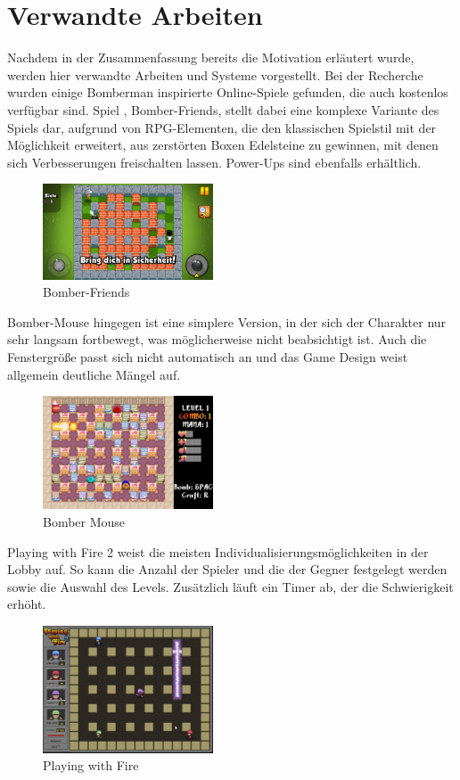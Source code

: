 \documentclass[conference]{IEEEtran}
\begin{document}
\section{Verwandte Arbeiten}
Nachdem in der Zusammenfassung bereits die Motivation erläutert wurde, werden hier verwandte Arbeiten und Systeme vorgestellt. Bei der Recherche wurden einige Bomberman inspirierte Online-Spiele gefunden, die auch kostenlos verfügbar sind. Spiel \cite{bombe-friends}, Bomber-Friends, stellt dabei eine komplexe Variante des Spiels dar, aufgrund von RPG-Elementen, die den klassischen Spielstil mit der Möglichkeit erweitert, aus zerstörten Boxen Edelsteine zu gewinnen, mit denen sich Verbesserungen freischalten lassen. Power-Ups sind ebenfalls erhältlich. 
\begin{figure}[H]
    \centering
    \includegraphics[width=0.45\textwidth]{res/bomberfriends.png}
    \caption{Bomber-Friends}
\end{figure}

Bomber-Mouse \cite{bombermouse} hingegen ist eine simplere Version, in der sich der Charakter nur sehr langsam fortbewegt, was möglicherweise nicht beabsichtigt ist. Auch die Fenstergröße passt sich nicht automatisch an und das Game Design weist allgemein deutliche Mängel auf.
\begin{figure}[H]
    \centering
    \includegraphics[width=0.45\textwidth]{res/bombermouse.png}
    \caption{Bomber Mouse}
\end{figure}
Playing with Fire 2 \cite{playingwithfire} weist die meisten Individualisierungsmöglichkeiten in der Lobby auf. So kann die Anzahl der Spieler und die der Gegner festgelegt werden sowie die Auswahl des Levels. Zusätzlich läuft ein Timer ab, der die Schwierigkeit erhöht. 
\begin{figure}[H]
    \centering
    \includegraphics[width=0.45\textwidth]{res/playing-with-fire.png}
    \caption{Playing with Fire}
\end{figure}
\end{document}
